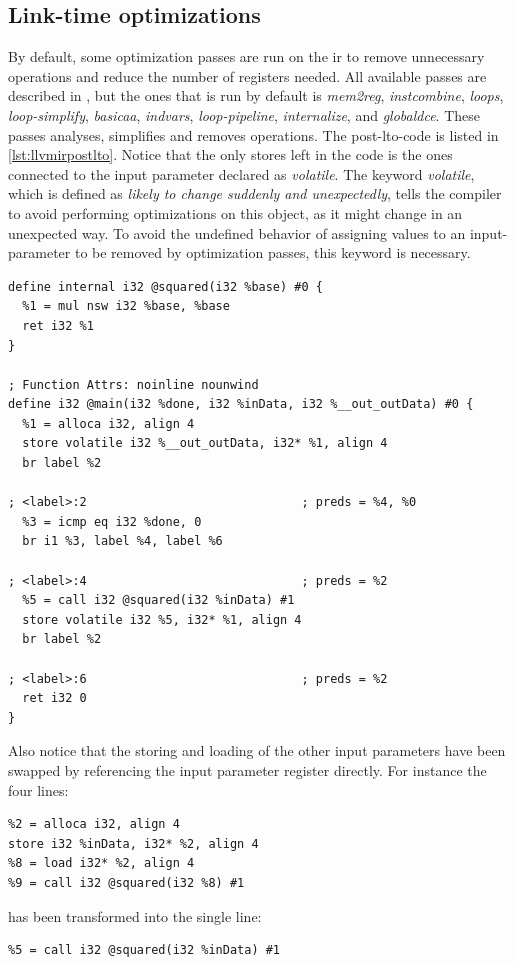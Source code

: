 \subsection{Link-time optimizations}
By default, some optimization passes are run on the \gls{ir} to remove unnecessary operations and reduce the number of registers needed. All available passes are described in \cite{llvmpasses}, but the ones that is run by default is \textit{mem2reg}, \textit{instcombine}, \textit{loops}, \textit{loop-simplify}, \textit{basicaa}, \textit{indvars}, \textit{loop-pipeline}, \textit{internalize}, and \textit{globaldce}. These passes analyses, simplifies and removes operations. The post-\gls{lto}-code is listed in \cref{lst:llvmirpostlto}. Notice that the only stores left in the code is the ones connected to the input parameter declared as \textit{volatile}. The keyword \textit{volatile}, which is defined as \textit{likely to change suddenly and unexpectedly}, tells the compiler to avoid performing optimizations on this object, as it might change in an unexpected way. To avoid the undefined behavior of assigning values to an input-parameter to be removed by optimization passes, this keyword is necessary.

\begin{lstlisting}[caption={LLVM IR after LTO},label=lst:llvmirpostlto]
define internal i32 @squared(i32 %base) #0 {
  %1 = mul nsw i32 %base, %base
  ret i32 %1
}

; Function Attrs: noinline nounwind
define i32 @main(i32 %done, i32 %inData, i32 %__out_outData) #0 {
  %1 = alloca i32, align 4
  store volatile i32 %__out_outData, i32* %1, align 4
  br label %2

; <label>:2                              ; preds = %4, %0
  %3 = icmp eq i32 %done, 0
  br i1 %3, label %4, label %6

; <label>:4                              ; preds = %2
  %5 = call i32 @squared(i32 %inData) #1
  store volatile i32 %5, i32* %1, align 4
  br label %2

; <label>:6                              ; preds = %2
  ret i32 0
}
\end{lstlisting}

Also notice that the storing and loading of the other input parameters have been swapped by referencing the input parameter register directly. For instance the four lines:

\begin{lstlisting}
%2 = alloca i32, align 4
store i32 %inData, i32* %2, align 4
%8 = load i32* %2, align 4
%9 = call i32 @squared(i32 %8) #1
\end{lstlisting}
has been transformed into the single line:
\begin{lstlisting}
%5 = call i32 @squared(i32 %inData) #1
\end{lstlisting}
